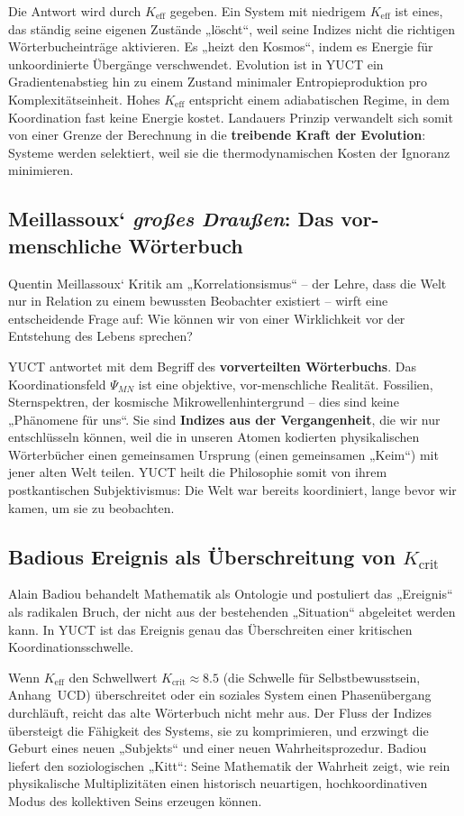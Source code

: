\documentclass[12pt,a4paper]{article}
\newcommand{\Keff}{K_{\mathrm{eff}}}
\begin{document}
	Die Antwort wird durch \(\Keff\) gegeben. Ein System mit niedrigem \(\Keff\) ist eines, das ständig seine eigenen Zustände „löscht“, weil seine Indizes nicht die richtigen Wörterbucheinträge aktivieren. Es „heizt den Kosmos“, indem es Energie für unkoordinierte Übergänge verschwendet. Evolution ist in YUCT ein Gradientenabstieg hin zu einem Zustand minimaler Entropieproduktion pro Komplexitätseinheit. Hohes \(\Keff\) entspricht einem adiabatischen Regime, in dem Koordination fast keine Energie kostet. Landauers Prinzip verwandelt sich somit von einer Grenze der Berechnung in die \textbf{treibende Kraft der Evolution}: Systeme werden selektiert, weil sie die thermodynamischen Kosten der Ignoranz minimieren.
	
	\subsection{Meillassoux‘ \emph{großes Draußen}: Das vor-menschliche Wörterbuch}
	
	Quentin Meillassoux‘ Kritik am „Korrelationsismus“ – der Lehre, dass die Welt nur in Relation zu einem bewussten Beobachter existiert – wirft eine entscheidende Frage auf: Wie können wir von einer Wirklichkeit vor der Entstehung des Lebens sprechen?
	
	YUCT antwortet mit dem Begriff des \textbf{vorverteilten Wörterbuchs}. Das Koordinationsfeld \(\Psi_{MN}\) ist eine objektive, vor-menschliche Realität. Fossilien, Sternspektren, der kosmische Mikrowellenhintergrund – dies sind keine „Phänomene für uns“. Sie sind \textbf{Indizes aus der Vergangenheit}, die wir nur entschlüsseln können, weil die in unseren Atomen kodierten physikalischen Wörterbücher einen gemeinsamen Ursprung (einen gemeinsamen „Keim“) mit jener alten Welt teilen. YUCT heilt die Philosophie somit von ihrem postkantischen Subjektivismus: Die Welt war bereits koordiniert, lange bevor wir kamen, um sie zu beobachten.
	
	\subsection{Badious Ereignis als Überschreitung von \(K_{\mathrm{crit}}\)}
	
	Alain Badiou behandelt Mathematik als Ontologie und postuliert das „Ereignis“ als radikalen Bruch, der nicht aus der bestehenden „Situation“ abgeleitet werden kann. In YUCT ist das Ereignis genau das Überschreiten einer kritischen Koordinationsschwelle.
	
	Wenn \(\Keff\) den Schwellwert \(K_{\mathrm{crit}} \approx 8.5\) (die Schwelle für Selbstbewusstsein, Anhang~UCD) überschreitet oder ein soziales System einen Phasenübergang durchläuft, reicht das alte Wörterbuch nicht mehr aus. Der Fluss der Indizes übersteigt die Fähigkeit des Systems, sie zu komprimieren, und erzwingt die Geburt eines neuen „Subjekts“ und einer neuen Wahrheitsprozedur. Badiou liefert den soziologischen „Kitt“: Seine Mathematik der Wahrheit zeigt, wie rein physikalische Multiplizitäten einen historisch neuartigen, hochkoordinativen Modus des kollektiven Seins erzeugen können.
	
\end{document}
